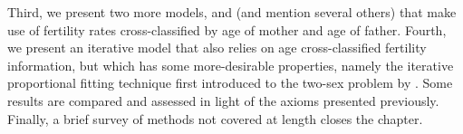 Third, we present two more models, \citet{gupta1978alternative} and
\citet{schoen1981harmonic} (and mention several others) that make use of
fertility rates cross-classified by age of mother and age of father. Fourth, 
we present an iterative model that also relies on age
cross-classified fertility information, but which has some more-desirable
properties, namely the iterative proportional fitting technique first
introduced to the two-sex problem by \citet{mc1975models}. Some results are
 compared and assessed in light of the axioms presented previously. Finally, a
 brief survey of methods not covered at length closes the chapter.
 
\FloatBarrier
